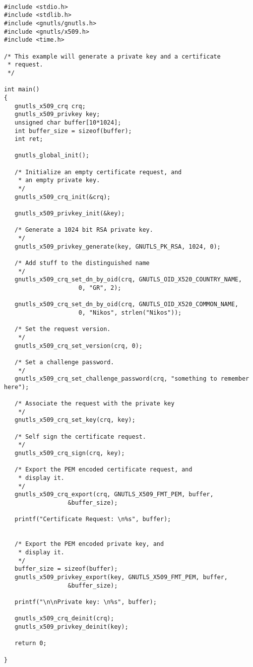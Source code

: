 \begin{verbatim}

#include <stdio.h>
#include <stdlib.h>
#include <gnutls/gnutls.h>
#include <gnutls/x509.h>
#include <time.h>

/* This example will generate a private key and a certificate
 * request.
 */

int main()
{
   gnutls_x509_crq crq;
   gnutls_x509_privkey key;
   unsigned char buffer[10*1024];
   int buffer_size = sizeof(buffer);
   int ret;

   gnutls_global_init();

   /* Initialize an empty certificate request, and
    * an empty private key.
    */
   gnutls_x509_crq_init(&crq);

   gnutls_x509_privkey_init(&key);

   /* Generate a 1024 bit RSA private key.
    */
   gnutls_x509_privkey_generate(key, GNUTLS_PK_RSA, 1024, 0);

   /* Add stuff to the distinguished name
    */
   gnutls_x509_crq_set_dn_by_oid(crq, GNUTLS_OID_X520_COUNTRY_NAME,
				     0, "GR", 2);

   gnutls_x509_crq_set_dn_by_oid(crq, GNUTLS_OID_X520_COMMON_NAME,
				     0, "Nikos", strlen("Nikos"));

   /* Set the request version.
    */
   gnutls_x509_crq_set_version(crq, 0);

   /* Set a challenge password.
    */
   gnutls_x509_crq_set_challenge_password(crq, "something to remember here");

   /* Associate the request with the private key
    */
   gnutls_x509_crq_set_key(crq, key);

   /* Self sign the certificate request.
    */
   gnutls_x509_crq_sign(crq, key);

   /* Export the PEM encoded certificate request, and
    * display it.
    */
   gnutls_x509_crq_export(crq, GNUTLS_X509_FMT_PEM, buffer,
			      &buffer_size);

   printf("Certificate Request: \n%s", buffer);


   /* Export the PEM encoded private key, and
    * display it.
    */
   buffer_size = sizeof(buffer);
   gnutls_x509_privkey_export(key, GNUTLS_X509_FMT_PEM, buffer,
				  &buffer_size);

   printf("\n\nPrivate key: \n%s", buffer);

   gnutls_x509_crq_deinit(crq);
   gnutls_x509_privkey_deinit(key);

   return 0;

}

\end{verbatim}
